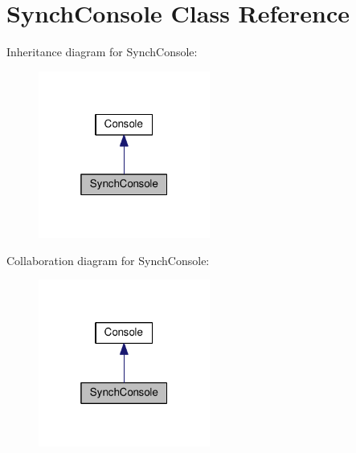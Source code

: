 \section{Synch\+Console Class Reference}
\label{class_synch_console}


Inheritance diagram for Synch\+Console\+:\nopagebreak
\begin{figure}[H]
\begin{center}
\leavevmode
\includegraphics[width=160pt]{class_synch_console__inherit__graph}
\end{center}
\end{figure}


Collaboration diagram for Synch\+Console\+:\nopagebreak
\begin{figure}[H]
\begin{center}
\leavevmode
\includegraphics[width=160pt]{class_synch_console__coll__graph}
\end{center}
\end{figure}
